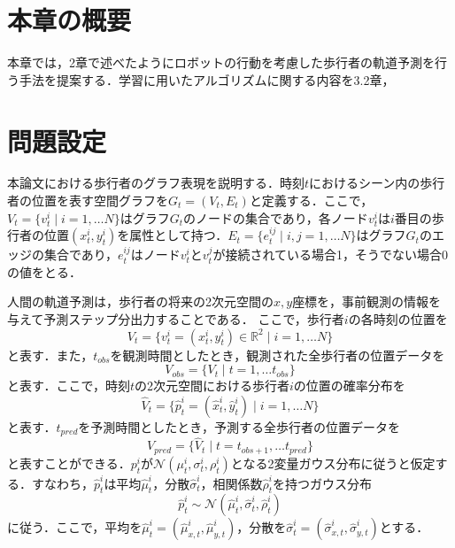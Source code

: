 
\section{本章の概要}

本章では，2章で述べたようにロボットの行動を考慮した歩行者の軌道予測を行う手法を提案する．学習に用いたアルゴリズムに関する内容を3.2章，



\section{問題設定}
本論文における歩行者のグラフ表現を説明する．時刻$t$におけるシーン内の歩行者の位置を表す空間グラフを$G_t = (V_t, E_t)$と定義する．ここで，$V_t = \{ v^i_t \mid i = 1, \dots N \}$はグラフ$G_t$のノードの集合であり，各ノード$v^i_t$は$i$番目の歩行者の位置$(x^i_t, y^i_t)$を属性として持つ．$E_t = \{ e^{ij}_t \mid i, j = 1, \dots N \}$はグラフ$G_t$のエッジの集合であり，$e^{ij}_t$はノード$v^i_t$と$v^j_t$が接続されている場合1，そうでない場合0の値をとる．

人間の軌道予測は，歩行者の将来の2次元空間の$x,y$座標を，事前観測の情報を与えて予測ステップ分出力することである．
ここで，歩行者$i$の各時刻の位置を
\begin{equation}
  V_t = \{ v^i_t = (x^i_t, y^i_t) \in \mathbb{R}^2 \mid i = 1, \dots N \}
\end{equation}
と表す．また，$t_{obs}$を観測時間としたとき，観測された全歩行者の位置データを
\begin{equation}
  V_{obs} = \{ V_t \mid t = 1, \dots t_{obs} \}  
\end{equation}
と表す．ここで，時刻$t$の2次元空間における歩行者$i$の位置の確率分布を
\begin{equation}
  \hat{V}_t = \{ \hat{p}^i_t = (\hat{x}^i_t, \hat{y}^i_t) \mid i = 1, \dots N \} \label{hat-pos}
\end{equation}
と表す．$t_{pred}$を予測時間としたとき，予測する全歩行者の位置データを
\begin{equation}
  V_{pred} = \{ \hat{V}_t \mid t = t_{obs + 1}, \dots t_{pred} \}
\end{equation}
と表すことができる．$p^i_t$が$\mathcal{N}(\mu^i_t, \sigma^i_t, \rho^i_t)$となる2変量ガウス分布に従うと仮定する．すなわち，$\hat{p}^i_t$は平均$\hat{\mu}^i_t$，分散$\hat{\sigma}^i_t$，相関係数$\hat{\rho}^i_t$を持つガウス分布
\begin{equation}
  \hat{p}^i_t \sim \mathcal{N}(\hat{\mu}^i_t, \hat{\sigma}^i_t, \hat{\rho}^i_t)
\end{equation}
に従う．ここで，平均を$\hat{\mu}^i_t = (\hat{\mu}^i_{x, t}, \hat{\mu}^i_{y, t})$，分散を$\hat{\sigma}^i_t = (\hat{\sigma}^i_{x, t}, \hat{\sigma}^i_{y, t})$とする．

